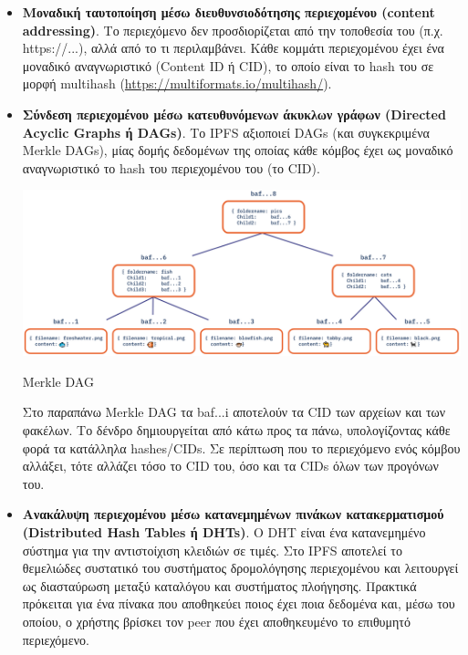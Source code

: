 \begin{itemize}
	\item \textbf{Μοναδική ταυτοποίηση μέσω διευθυνσιοδότησης περιεχομένου (content addressing)}. Το περιεχόμενο δεν προσδιορίζεται από την τοποθεσία του (π.χ. https://...), αλλά από το τι περιλαμβάνει. Κάθε κομμάτι περιεχομένου έχει ένα μοναδικό αναγνωριστικό (Content ID ή CID), το οποίο είναι το hash του σε μορφή multihash (\url{https://multiformats.io/multihash/}).
	\item \textbf{Σύνδεση περιεχομένου μέσω κατευθυνόμενων άκυκλων γράφων (Directed Acyclic Graphs ή DAGs)}. Το IPFS αξιοποιεί DAGs (και συγκεκριμένα Merkle DAGs), μίας δομής δεδομένων της οποίας κάθε κόμβος έχει ως μοναδικό αναγνωριστικό το hash του περιεχομένου του (το CID).

	\begin{enumitemcenteredfigure}
		\includegraphics[width=.95\textwidth]{assets/figures/chapter-2/2.7.merkle-dag.png}
		\caption{Merkle DAG\cite{2.7-merkle-dags-proto-school}}
	\end{enumitemcenteredfigure}

	Στο παραπάνω Merkle DAG τα baf...i αποτελούν τα CID των αρχείων και των φακέλων. Το δένδρο δημιουργείται από κάτω προς τα πάνω, υπολογίζοντας κάθε φορά τα κατάλληλα hashes/CIDs. Σε περίπτωση που το περιεχόμενο ενός κόμβου αλλάξει, τότε αλλάζει τόσο το CID του, όσο και τα CIDs όλων των προγόνων του.
	\item \textbf{Ανακάλυψη περιεχομένου μέσω κατανεμημένων πινάκων κατακερματισμού (\textenglish{Distributed Hash Tables ή DHTs})}. Ο DHT είναι ένα κατανεμημένο σύστημα για την αντιστοίχιση κλειδιών σε τιμές. Στο IPFS αποτελεί το θεμελιώδες συστατικό του συστήματος δρομολόγησης περιεχομένου και λειτουργεί ως διασταύρωση μεταξύ καταλόγου και συστήματος πλοήγησης. Πρακτικά πρόκειται για ένα πίνακα που αποθηκεύει ποιος έχει ποια δεδομένα και, μέσω του οποίου, ο χρήστης βρίσκει τον peer που έχει αποθηκευμένο το επιθυμητό περιεχόμενο.
\end{itemize}

